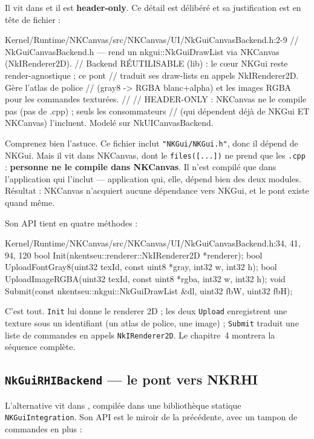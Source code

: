 Il vit dans 
et il est \textbf{header-only}. Ce détail est délibéré et sa justification est en
tête de fichier :

\begin{nkcode}{Kernel/Runtime/NKCanvas/src/NKCanvas/UI/NkGuiCanvasBackend.h:2-9}
// NkGuiCanvasBackend.h — rend un nkgui::NkGuiDrawList via NKCanvas (NkIRenderer2D).
// Backend RÉUTILISABLE (lib) : le cœur NKGui reste render-agnostique ; ce pont
// traduit ses draw-lists en appels NkIRenderer2D. Gère l'atlas de police
// (gray8 -> RGBA blanc+alpha) et les images RGBA pour les commandes texturées.
//
// HEADER-ONLY : NKCanvas ne le compile pas (pas de .cpp) ; seuls les consommateurs
// (qui dépendent déjà de NKGui ET NKCanvas) l'incluent. Modelé sur NkUICanvasBackend.
\end{nkcode}

Comprenez bien l'astuce. Ce fichier inclut \texttt{"NKGui/NKGui.h"}, donc il
dépend de NKGui. Mais il vit dans NKCanvas, dont le \texttt{files([...])} ne
prend que les \texttt{.cpp} : \textbf{personne ne le compile dans NKCanvas}. Il
n'est compilé que dans l'application qui l'inclut — application qui, elle,
dépend bien des deux modules. Résultat : NKCanvas n'acquiert aucune dépendance
vers NKGui, et le pont existe quand même.

Son API tient en quatre méthodes :

\begin{nkcode}{Kernel/Runtime/NKCanvas/src/NKCanvas/UI/NkGuiCanvasBackend.h:34, 41, 94, 120}
bool Init(nkentseu::renderer::NkIRenderer2D *renderer);
bool UploadFontGray8(uint32 texId, const uint8 *gray, int32 w, int32 h);
bool UploadImageRGBA(uint32 texId, const uint8 *rgba, int32 w, int32 h);
void Submit(const nkentseu::nkgui::NkGuiDrawList &dl, uint32 fbW, uint32 fbH);
\end{nkcode}

C'est tout. \texttt{Init} lui donne le renderer 2D ; les deux \texttt{Upload}
enregistrent une texture sous un identifiant (un atlas de police, une image) ;
\texttt{Submit} traduit une liste de commandes en appels
\texttt{NkIRenderer2D}. Le chapitre~4 montrera la séquence complète.

\subsection{\texttt{NkGuiRHIBackend} — le pont vers NKRHI}

L'alternative vit dans , compilée
dans une bibliothèque statique \texttt{NKGuiIntegration}. Son API est le miroir
de la précédente, avec un tampon de commandes en plus :

